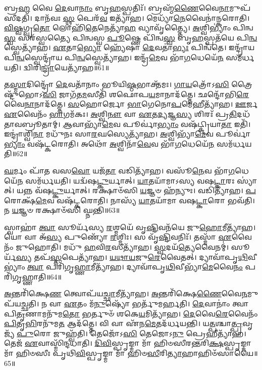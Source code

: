𑌬𑍍𑌰\-\ul{𑌹𑍍𑌮} 𑌵𑍈 \ul{𑌦𑍇}\-𑌵𑌾\-\ul{𑌨𑌾𑌂} 𑌬𑍃\-\ul{𑌹}\-𑌸𑍍𑌪𑌤𑌿𑌃᳴। 
𑌬𑍍𑌰𑌹𑍍𑌮᳴\-\ul{𑌣𑍈}\-𑌵𑍈\-\ul{𑌨𑌾}\-𑌮𑍁𑌪᳴𑌸𑍀𑌦𑌤𑌿। 
𑌦𑌾𑌨᳴𑌵𑌃 \ul{𑌸𑍍𑌥} 𑌪𑍇𑌰᳴\-\ul{𑌵} 𑌇𑌤𑍍𑌯𑌾᳴𑌹। 
𑌮𑍇𑌧𑍍𑌯𑌾᳴\-\ul{𑌨𑍇}\-𑌵𑍈𑌨𑌾॑𑌨𑍍𑌕𑌰𑍋𑌤𑌿। 
\-\ul{𑌵𑌿}\-\-\ul{𑌷𑍍𑌵}\-𑌗𑍍𑌵𑍃\-\ul{𑌤𑍋} 𑌲𑍋𑌹𑌿᳴\-\ul{𑌤𑍇}\-𑌨𑍇𑌤𑍍𑌯𑌾᳴\-\ul{𑌹} 𑌵𑍍𑌯𑌾𑌵𑍃᳴𑌤𑍍𑌤𑍍𑌯𑍈। 
\-\ul{𑌅}\-𑌶𑍍𑌵𑌿𑌭𑍍𑌯𑌾𑌂॑ 𑌪𑌿𑌨𑍍𑌵\-\ul{𑌸𑍍𑌵} 𑌸𑌰᳴𑌸𑍍𑌵𑌤𑍍𑌯𑍈 𑌪𑌿𑌨𑍍𑌵𑌸𑍍𑌵 \ul{𑌪𑍂}\-𑌷𑍍𑌣𑍇 𑌪𑌿᳴𑌨𑍍𑌵\-\ul{𑌸𑍍𑌵} 𑌬𑍃\-\ul{𑌹}\-𑌸𑍍𑌪𑌤᳴𑌯𑍇 𑌪𑌿\-\ul{𑌨𑍍𑌵}\-𑌸𑍍𑌵𑍇𑌤𑍍𑌯𑌾᳴𑌹। 
\-\ul{𑌏}\-𑌤𑌾\-\ul{𑌭𑍍𑌯𑍋} 𑌹𑍍𑌯𑍇᳴𑌷𑌾 \ul{𑌦𑍇}\-𑌵𑌤𑌾॑\-\ul{𑌭𑍍𑌯𑌃} 𑌪𑌿𑌨𑍍𑌵᳴𑌤𑍇। 
𑌇𑌨𑍍𑌦𑍍𑌰𑌾᳴𑌯 𑌪𑌿\-\ul{𑌨𑍍𑌵}\-𑌸𑍍𑌵𑍇𑌨𑍍𑌦𑍍𑌰𑌾᳴𑌯 𑌪𑌿\-\ul{𑌨𑍍𑌵}\-𑌸𑍍𑌵𑍇𑌤𑍍𑌯𑌾᳴𑌹। 
𑌇𑌨𑍍𑌦𑍍𑌰᳴\-\ul{𑌮𑍇}\-𑌵 𑌭𑌾᳴\-\ul{𑌗}\-𑌧𑍇𑌯𑍇᳴\-\ul{𑌨} 𑌸𑌮᳴𑌰𑍍𑌧𑌯𑌤𑌿। 
𑌦𑍍𑌵𑌿𑌰𑌿\-\ul{𑌨𑍍𑌦𑍍𑌰𑌾}\-𑌯𑍇𑌤𑍍𑌯𑌾᳴𑌹॥61॥

𑌤\-\ul{𑌸𑍍𑌮𑌾}\-𑌦𑌿𑌨𑍍𑌦𑍍𑌰𑍋᳴ \ul{𑌦𑍇}\-𑌵𑌤𑌾᳴𑌨𑌾𑌂 𑌭𑍂𑌯𑌿\-\ul{𑌷𑍍𑌠}\-𑌭𑌾𑌕𑍍𑌤᳴𑌮𑌃। 
\-\ul{𑌗𑌾}\-\-\ul{𑌯}\-𑌤𑍍𑌰𑍋᳴𑌽\-\ul{𑌸𑌿} 𑌤𑍍𑌰𑍈𑌷𑍍𑌟𑍁᳴𑌭𑍋𑌽\-\ul{𑌸𑌿} 𑌜𑌾𑌗᳴𑌤\-\ul{𑌮}\-𑌸𑍀𑌤𑌿᳴ 𑌶𑌫𑍋𑌪\-\ul{𑌯}\-𑌮𑌾𑌨𑌾𑌦᳴𑌤𑍍𑌤𑍇। 
𑌛𑌨𑍍𑌦𑍋᳴𑌭𑌿\-\-\ul{𑌰𑍇}\-𑌵𑍈\-\ul{𑌨𑌾}\-𑌨𑌾𑌦᳴𑌤𑍍𑌤𑍇। 
\-\ul{𑌸}\-𑌹𑍋𑌰𑍍𑌜𑍋 \ul{𑌭𑌾}\-𑌗𑍇𑌨𑍋\-\ul{𑌪}\-𑌮𑍇𑌹𑍀𑌤𑍍𑌯𑌾᳴𑌹। 
\-\ul{𑌊}\-𑌰𑍍𑌜 \ul{𑌏}\-𑌵𑍈𑌨𑌂᳴ \ul{𑌭𑌾}\-𑌗𑌮᳴𑌕𑌃। 
\-\ul{𑌅}\-𑌶𑍍𑌵𑌿\-\ul{𑌨𑍗} 𑌵𑌾 \ul{𑌏}\-𑌤\-\ul{𑌦𑍍𑌯}\-𑌜𑍍𑌞\-\ul{𑌸𑍍𑌯} 𑌶𑌿𑌰𑌃᳴ 𑌪𑍍𑌰\-\ul{𑌤𑌿}\-𑌦𑌧᳴𑌤𑌾𑌵𑌬𑍍𑌰𑍂𑌤𑌾𑌮𑍍। 
\-\ul{𑌆}\-𑌵𑌾𑌭𑍍𑌯𑌾᳴\-\ul{𑌮𑍇}\-𑌵 𑌪𑍂𑌰𑍍𑌵𑌾॑\-\ul{𑌭𑍍𑌯𑌾𑌂} 𑌵𑌷᳴𑌟𑍍𑌕𑍍𑌰𑌿𑌯𑌾\-\ul{𑌤𑌾} 𑌇𑌤𑌿᳴। 
𑌇𑌨𑍍𑌦𑍍𑌰𑌾॑𑌶𑍍𑌵𑌿\-\ul{𑌨𑌾} 𑌮𑌧𑍁᳴𑌨𑌃 𑌸𑌾\-\ul{𑌰}\-𑌘𑌸𑍍𑌯𑍇𑌤𑍍𑌯𑌾᳴𑌹। 
\-\ul{𑌅}\-𑌶𑍍𑌵𑌿𑌭𑍍𑌯𑌾᳴\-\ul{𑌮𑍇}\-𑌵 𑌪𑍂𑌰𑍍𑌵𑌾॑\-\ul{𑌭𑍍𑌯𑌾𑌂} 𑌵𑌷᳴𑌟𑍍𑌕𑌰𑍋𑌤𑌿। 
𑌅𑌥𑍋᳴ \ul{𑌅}\-𑌶𑍍𑌵𑌿𑌨𑌾᳴\-\ul{𑌵𑍇}\-𑌵 𑌭𑌾᳴\-\ul{𑌗}\-𑌧𑍇𑌯𑍇᳴\-\ul{𑌨} 𑌸𑌮᳴𑌰𑍍𑌧𑌯𑌤𑌿॥62॥

\-\ul{𑌘}\-𑌰𑍍𑌮𑌂 𑌪𑌾᳴𑌤 𑌵𑌸\-\ul{𑌵𑍋} 𑌯𑌜᳴\-\ul{𑌤𑌾} 𑌵𑌡𑌿𑌤𑍍𑌯𑌾᳴𑌹। 
𑌵𑌸𑍂᳴\-\ul{𑌨𑍇}\-𑌵 𑌭𑌾᳴\-\ul{𑌗}\-𑌧𑍇𑌯𑍇᳴\-\ul{𑌨} 𑌸𑌮᳴𑌰𑍍𑌧𑌯𑌤𑌿। 
𑌯𑌦𑍍𑌵᳴𑌷\-\ul{𑌟𑍍𑌕𑍁}\-𑌰𑍍𑌯𑌾𑌤𑍍। 
\-\ul{𑌯𑌾}\-𑌤𑌯𑌾᳴𑌮𑌾𑌽𑌸𑍍𑌯 𑌵𑌷\-\ul{𑌟𑍍𑌕𑌾}\-𑌰𑌃 𑌸𑍍𑌯𑌾॑𑌤𑍍। 
𑌯𑌨𑍍𑌨 𑌵᳴𑌷\-\ul{𑌟𑍍𑌕𑍁}\-𑌰𑍍𑌯𑌾𑌤𑍍। 
𑌰𑌕𑍍𑌷𑌾𑍞᳴𑌸𑌿 \ul{𑌯}\-𑌜𑍍𑌞𑍞 𑌹᳴𑌨𑍍𑌯𑍁𑌃। 
𑌵𑌡𑌿𑌤𑍍𑌯𑌾᳴𑌹। 
\-\ul{𑌪}\-𑌰𑍋𑌕𑍍𑌷᳴\-\ul{𑌮𑍇}\-𑌵 𑌵𑌷᳴𑌟𑍍𑌕𑌰𑍋𑌤𑌿। 
𑌨𑌾𑌸𑍍𑌯᳴ \ul{𑌯𑌾}\-𑌤𑌯𑌾᳴𑌮𑌾 𑌵𑌷\-\ul{𑌟𑍍𑌕𑌾}\-𑌰𑍋 𑌭𑌵᳴𑌤𑌿। 
𑌨 \ul{𑌯}\-𑌜𑍍𑌞𑍞 𑌰𑌕𑍍𑌷𑌾𑍞᳴𑌸𑌿 𑌘𑍍𑌨𑌨𑍍𑌤𑌿॥63॥

𑌸𑍍𑌵𑌾𑌹𑌾॑ \ul{𑌤𑍍𑌵𑌾} 𑌸𑍂𑌰𑍍𑌯᳴𑌸𑍍𑌯 \ul{𑌰}\-𑌶𑍍𑌮𑌯𑍇᳴ 𑌵𑍃\-\ul{𑌷𑍍𑌟𑌿}\-𑌵𑌨᳴𑌯𑍇 𑌜𑍁\-\ul{𑌹𑍋}\-𑌮𑍀𑌤𑍍𑌯𑌾᳴𑌹। 
𑌯𑍋 𑌵𑌾 𑌅᳴\-\ul{𑌸𑍍𑌯} 𑌪𑍁𑌣𑍍𑌯𑍋᳴ \ul{𑌰}\-𑌶𑍍𑌮𑌿𑌃। 
𑌸 𑌵𑍃᳴\-\ul{𑌷𑍍𑌟𑌿}\-𑌵𑌨𑌿𑌃᳴। 
𑌤𑌸𑍍𑌮𑌾᳴ \ul{𑌏}\-𑌵𑍈𑌨𑌂᳴ 𑌜𑍁𑌹𑍋𑌤𑌿। 
𑌮𑌧𑍁᳴ \ul{𑌹}\-𑌵𑌿\-\ul{𑌰}\-𑌸𑍀𑌤𑍍𑌯𑌾᳴𑌹। 
\-\ul{𑌸𑍍𑌵}\-𑌦𑌯᳴\-\ul{𑌤𑍍𑌯𑍇}\-𑌵𑍈𑌨𑌮𑍍॑। 
𑌸𑍂𑌰𑍍𑌯᳴\-\ul{𑌸𑍍𑌯} 𑌤𑌪᳴\-\ul{𑌸𑍍𑌤}\-𑌪𑍇𑌤𑍍𑌯𑌾᳴𑌹। 
\-\ul{𑌯}\-\-\ul{𑌥𑌾}\-\-\ul{𑌯}\-𑌜𑍁\-\ul{𑌰𑍇}\-𑌵𑍈𑌤𑌤𑍍। 
𑌦𑍍𑌯𑌾𑌵𑌾᳴𑌪𑍃\-\ul{𑌥𑌿}\-𑌵𑍀𑌭𑍍𑌯𑌾𑌂॑ \ul{𑌤𑍍𑌵𑌾} 𑌪𑌰𑌿᳴𑌗𑍃\-\ul{𑌹𑍍𑌣𑌾}\-𑌮𑍀𑌤𑍍𑌯𑌾᳴𑌹। 
𑌦𑍍𑌯𑌾𑌵𑌾᳴𑌪𑍃\-\ul{𑌥𑌿}\-𑌵𑍀𑌭𑍍𑌯𑌾᳴\-\ul{𑌮𑍇}\-𑌵𑍈\-\ul{𑌨𑌂} 𑌪𑌰𑌿᳴𑌗𑍃𑌹𑍍𑌣𑌾𑌤𑌿॥64॥

\-\ul{𑌅}\-𑌨𑍍𑌤𑌰𑌿᳴𑌕𑍍𑌷𑍇\-\ul{𑌣} 𑌤𑍍𑌵𑍋𑌪᳴𑌯\-\ul{𑌚𑍍𑌛𑌾}\-𑌮𑍀𑌤𑍍𑌯𑌾᳴𑌹। 
\-\ul{𑌅}\-𑌨𑍍𑌤𑌰𑌿᳴𑌕𑍍𑌷𑍇\-\ul{𑌣𑍈}\-𑌵𑍈\-\ul{𑌨}\-𑌮𑍁𑌪᳴𑌯𑌚𑍍𑌛𑌤𑌿। 
𑌨 𑌵𑌾 \ul{𑌏}\-𑌤𑌂 𑌮᳴\-\ul{𑌨𑍁}\-𑌷𑍍𑌯𑍋᳴ 𑌭𑌰𑍍𑌤𑍁᳴𑌮𑌰𑍍\mbox{}𑌹𑌤𑌿। 
\-\ul{𑌦𑍇}\-𑌵𑌾𑌨𑌾𑌂॑ 𑌤𑍍𑌵𑌾 𑌪𑌿\-\ul{𑌤𑍃}\-𑌣𑌾𑌮𑌨𑍁᳴𑌮\-\ul{𑌤𑍋} 𑌭𑌰𑍍𑌤𑍁𑍞᳴ 𑌶𑌕𑍇\-\ul{𑌯}\-𑌮𑌿𑌤𑍍𑌯𑌾᳴𑌹। 
\-\ul{𑌦𑍇}\-𑌵𑍈\-\ul{𑌰𑍇}\-𑌵𑍈𑌨𑌂᳴ \ul{𑌪𑌿}\-𑌤𑍃\-\ul{𑌭𑌿}\-𑌰𑌨𑍁᳴𑌮\-\ul{𑌤} 𑌆𑌦᳴𑌤𑍍𑌤𑍇। 
𑌵𑌿 𑌵𑌾 𑌏᳴𑌨\-\ul{𑌮𑍇}\-𑌤𑌦᳴𑌰𑍍𑌧𑌯𑌨𑍍𑌤𑌿। 
𑌯\-\ul{𑌤𑍍𑌪}\-𑌶𑍍𑌚𑌾\-\ul{𑌤𑍍𑌪𑍍𑌰}\-𑌵𑍃𑌜𑍍𑌯᳴ \ul{𑌪𑍁}\-𑌰𑍋 𑌜𑍁𑌹𑍍𑌵᳴𑌤𑌿। 
𑌤𑍇𑌜𑍋᳴𑌽\-\ul{𑌸𑌿} 𑌤𑍇𑌜𑍋𑌽\-\ul{𑌨𑍁} 𑌪𑍍𑌰𑍇𑌹𑍀𑌤𑍍𑌯𑌾᳴𑌹। 
𑌤𑍇𑌜᳴ \ul{𑌏}\-𑌵𑌾𑌸𑍍𑌮𑌿᳴𑌨𑍍𑌦𑌧𑌾𑌤𑌿। 
\-\ul{𑌦𑌿}\-\-\ul{𑌵𑌿}\-𑌸𑍍𑌪𑍃𑌙𑍍𑌮𑌾 𑌮𑌾᳴ 𑌹𑌿𑍞𑌸𑍀𑌰𑌨𑍍𑌤𑌰𑌿\-\ul{𑌕𑍍𑌷}\-𑌸𑍍𑌪𑍃𑌙𑍍𑌮𑌾 𑌮𑌾᳴ 𑌹𑌿𑍞𑌸𑍀𑌃 𑌪𑍃𑌥𑌿\-\ul{𑌵𑌿}\-𑌸𑍍𑌪𑍃𑌙𑍍𑌮𑌾 𑌮𑌾᳴ 𑌹𑌿𑍞\-\ul{𑌸𑍀}\-𑌰𑌿\-\ul{𑌤𑍍𑌯𑌾}\-𑌹𑌾𑌹𑌿𑍞᳴𑌸𑌾𑌯𑍈॥65॥

